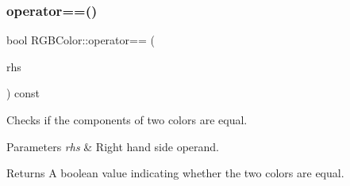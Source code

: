 \subsubsection{\texorpdfstring{operator==()}{operator==()}}
{\footnotesize\ttfamily bool R\+G\+B\+Color\+::operator== (\begin{DoxyParamCaption}\item[{const \hyperlink{class_r_g_b_color}{R\+G\+B\+Color} \&}]{rhs }\end{DoxyParamCaption}) const\hspace{0.3cm}{\ttfamily [inline]}}

Checks if the components of two colors are equal. 
\begin{DoxyParams}{Parameters}
{\em rhs} & Right hand side operand. \\
\hline
\end{DoxyParams}
\begin{DoxyReturn}{Returns}
A boolean value indicating whether the two colors are equal. 
\end{DoxyReturn}
